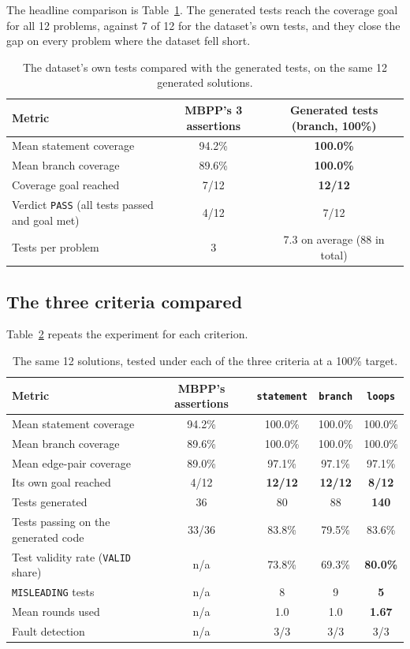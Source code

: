 \documentclass[11pt,a4paper]{article}
\begin{document}
The headline comparison is Table~\ref{tab:headline}. The generated tests reach the coverage goal for all 12
problems, against 7 of 12 for the dataset's own tests, and they close the gap on every problem where the
dataset fell short.

\begin{table}[htbp]
\centering
\small
\caption{The dataset's own tests compared with the generated tests, on the same 12 generated solutions.}
\label{tab:headline}
\begin{tabular}{@{}lcc@{}}
\toprule
\textbf{Metric} & \textbf{MBPP's 3 assertions} & \textbf{Generated tests (branch, 100\%)} \\
\midrule
Mean statement coverage & 94.2\% & \textbf{100.0\%} \\
Mean branch coverage & 89.6\% & \textbf{100.0\%} \\
Coverage goal reached & 7/12 & \textbf{12/12} \\
Verdict \texttt{PASS} (all tests passed and goal met) & 4/12 & 7/12 \\
Tests per problem & 3 & 7.3 on average (88 in total) \\
\bottomrule
\end{tabular}
\end{table}

\subsection{The three criteria compared}

Table~\ref{tab:criteria-results} repeats the experiment for each criterion.

\begin{table}[htbp]
\centering
\small
\caption{The same 12 solutions, tested under each of the three criteria at a 100\% target.}
\label{tab:criteria-results}
\begin{tabular}{@{}lcccc@{}}
\toprule
\textbf{Metric} & \textbf{MBPP's assertions} & \texttt{statement} & \texttt{branch} & \texttt{loops} \\
\midrule
Mean statement coverage & 94.2\% & 100.0\% & 100.0\% & 100.0\% \\
Mean branch coverage & 89.6\% & 100.0\% & 100.0\% & 100.0\% \\
Mean edge-pair coverage & 89.0\% & 97.1\% & 97.1\% & 97.1\% \\
Its own goal reached & 4/12 & \textbf{12/12} & \textbf{12/12} & \textbf{8/12} \\
Tests generated & 36 & 80 & 88 & \textbf{140} \\
Tests passing on the generated code & 33/36 & 83.8\% & 79.5\% & 83.6\% \\
Test validity rate (\texttt{VALID} share) & n/a & 73.8\% & 69.3\% & \textbf{80.0\%} \\
\texttt{MISLEADING} tests & n/a & 8 & 9 & \textbf{5} \\
Mean rounds used & n/a & 1.0 & 1.0 & \textbf{1.67} \\
Fault detection & n/a & 3/3 & 3/3 & 3/3 \\
\bottomrule
\end{tabular}
\end{table}
\end{document}

